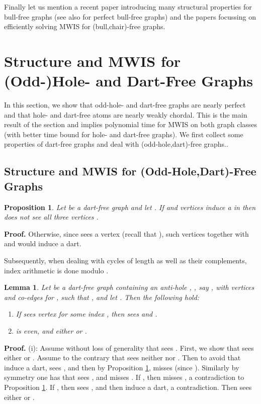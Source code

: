 \documentclass[11pt]{article}
\newcommand{\qed}{\hfill }
\newcommand{\0}{\text{ has a co-join to }}
\newcommand{\1}{\text{ has a join to }}
\newtheorem{lemm}{Lemma}
\newtheorem{prop}{Proposition}
\begin{document}
Finally let us mention a recent paper \cite{Chudn2011} introducing many structural properties for bull-free graphs (see also \cite{DeFMafPor1997} for perfect bull-free graphs) and the papers \cite{BraHoaLe2003,DeSSas1993} focussing on efficiently solving MWIS for (bull,chair)-free graphs. 

\section{Structure and MWIS for (Odd-)Hole- and Dart-Free Graphs}

In this section, we show that odd-hole- and dart-free graphs are nearly perfect and that hole- and dart-free atoms are nearly weakly chordal. This is the main result of the section and implies polynomial time for MWIS on both graph classes (with better time bound for hole- and dart-free graphs). We first collect some properties of dart-free graphs and deal with (odd-hole,dart)-free graphs.. 

\subsection{Structure and MWIS for (Odd-Hole,Dart)-Free Graphs}

\begin{prop}\label{prop:1}
Let  be a dart-free graph and let . If  and vertices  induce a  in  then  does not see all three vertices 
. 
\end{prop}

\noindent
{\bf Proof.} Otherwise, since  sees a vertex  (recall that ), such vertices  together with  and  would induce a dart. \qed

\medskip

Subsequently, when dealing with cycles of length  as well as their complements, index arithmetic is done modulo .

\begin{lemm}\label{lemm:1}
Let  be a dart-free graph containing an anti-hole , , say , with vertices  and co-edges  for , such that , and let . Then the following hold:
\begin{enumerate}
\item[] If  sees vertex  for some index , then  sees  and .
\item[]  is even, and either  or 
.
\end{enumerate}
\end{lemm}

\noindent
{\bf Proof.} (i): Assume without loss of generality that  sees . First, we show that  sees either  or .
Assume to the contrary that  sees neither  nor . Then to avoid that  induce a dart,  sees , and then by Proposition \ref{prop:1},  misses  (since ). Similarly by symmetry one has that  sees , and  misses . If , then  misses , a contradiction to Proposition \ref{prop:1}. If , then  sees , and then  induce a dart, a contradiction. Then  sees either  or .
\end{document}
